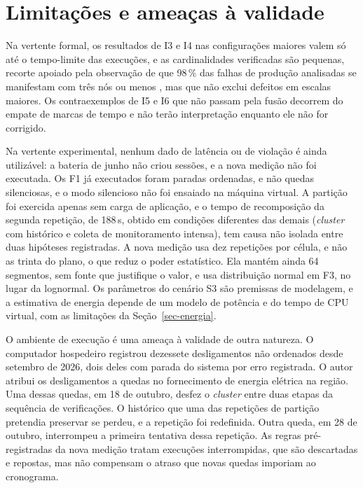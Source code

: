 \section*{Limitações e ameaças à validade}
\label{sec-limitacoes}

Na vertente formal, os resultados de I3 e I4 nas configurações maiores valem só até o tempo-limite das execuções, e as cardinalidades verificadas são pequenas, recorte apoiado pela observação de que 98\,\% das falhas de produção analisadas se manifestam com três nós ou menos \citep{yuan_simple_testing_2014}, mas que não exclui defeitos em escalas maiores. Os contraexemplos de I5 e I6 que não passam pela fusão decorrem do empate de marcas de tempo e não terão interpretação enquanto ele não for corrigido.

Na vertente experimental, nenhum dado de latência ou de violação é ainda utilizável: a bateria de junho não criou sessões, e a nova medição não foi executada. Os F1 já executados foram paradas ordenadas, e não quedas silenciosas, e o modo silencioso não foi ensaiado na máquina virtual. A partição foi exercida apenas sem carga de aplicação, e o tempo de recomposição da segunda repetição, de 188\,s, obtido em condições diferentes das demais (\emph{cluster} com histórico e coleta de monitoramento intensa), tem causa não isolada entre duas hipóteses registradas. A nova medição usa dez repetições por célula, e não as trinta do plano, o que reduz o poder estatístico. Ela mantém ainda 64 segmentos, sem fonte que justifique o valor, e usa distribuição normal em F3, no lugar da lognormal. Os parâmetros do cenário S3 são premissas de modelagem, e a estimativa de energia depende de um modelo de potência e do tempo de CPU virtual, com as limitações da Seção~\ref{sec-energia}.

O ambiente de execução é uma ameaça à validade de outra natureza. O computador hospedeiro registrou dezessete desligamentos não ordenados desde setembro de 2026, dois deles com parada do sistema por erro registrada. O autor atribui os desligamentos a quedas no fornecimento de energia elétrica na região. Uma dessas quedas, em 18 de outubro, desfez o \emph{cluster} entre duas etapas da sequência de verificações. O histórico que uma das repetições de partição pretendia preservar se perdeu, e a repetição foi redefinida. Outra queda, em 28 de outubro, interrompeu a primeira tentativa dessa repetição. As regras pré-registradas da nova medição tratam execuções interrompidas, que são descartadas e repostas, mas não compensam o atraso que novas quedas imporiam ao cronograma.

